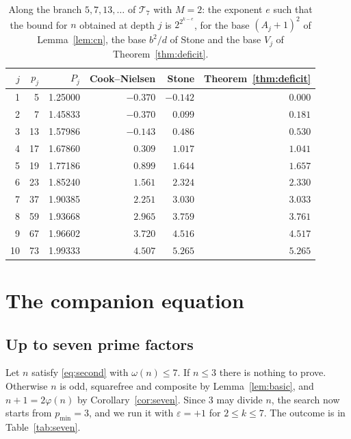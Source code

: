 \documentclass[11pt,reqno]{amsart}
\numberwithin{equation}{section}
\theoremstyle{plain}
\theoremstyle{definition}
\theoremstyle{remark}
\begin{document}
\begin{table}[ht]
\centering
\caption{Along the branch $5,7,13,\dots$ of $\mathcal T_7$ with
$M=2$: the exponent $e$ such that the bound for $n$ obtained at depth
$j$ is $2^{2^{k-e}}$, for the base $(A_j+1)^2$ of Lemma~\ref{lem:cn},
the base $b^2/d$ of Stone and the base $V_j$ of
Theorem~\ref{thm:deficit}.}
\label{tab:bases}
\smallskip
\small
\begin{tabular}{@{}rrrrrr@{}}
\toprule
$j$ & $p_j$ & $P_j$ & Cook--Nielsen & Stone & Theorem~\ref{thm:deficit}\\
\midrule
1 & 5 & 1.25000 & $-0.370$ & $-0.142$ & $0.000$\\
2 & 7 & 1.45833 & $-0.370$ & $0.099$ & $0.181$\\
3 & 13 & 1.57986 & $-0.143$ & $0.486$ & $0.530$\\
4 & 17 & 1.67860 & $0.309$ & $1.017$ & $1.041$\\
5 & 19 & 1.77186 & $0.899$ & $1.644$ & $1.657$\\
6 & 23 & 1.85240 & $1.561$ & $2.324$ & $2.330$\\
7 & 37 & 1.90385 & $2.251$ & $3.030$ & $3.033$\\
8 & 59 & 1.93668 & $2.965$ & $3.759$ & $3.761$\\
9 & 67 & 1.96602 & $3.720$ & $4.516$ & $4.517$\\
10 & 73 & 1.99333 & $4.507$ & $5.265$ & $5.265$\\
\bottomrule
\end{tabular}
\end{table}

\section{The companion equation}\label{sec:second}

\subsection{Up to seven prime factors}\label{sec:seven}
Let $n$ satisfy \eqref{eq:second} with $\omega(n)\le7$. If $n\le3$
there is nothing to prove. Otherwise $n$ is odd, squarefree and
composite by Lemma~\ref{lem:basic}, and $n+1=2\varphi(n)$ by
Corollary~\ref{cor:seven}. Since $3$ may divide $n$, the search now
starts from $p_{\min}=3$, and we run it with $\varepsilon=+1$ for
$2\le k\le7$. The outcome is in Table~\ref{tab:seven}.
\end{document}
